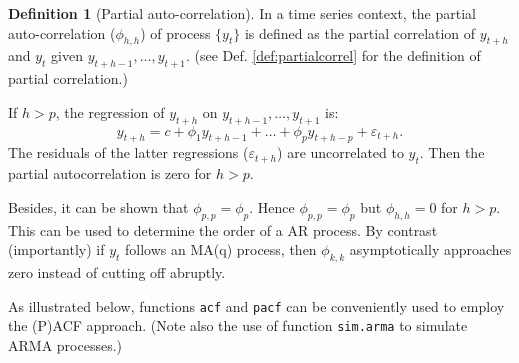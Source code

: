 \documentclass[
  12pt,
]{book}
\theoremstyle{definition}
\newtheorem{definition}{Definition}[chapter]
\theoremstyle{definition}
\theoremstyle{definition}
\theoremstyle{definition}
\theoremstyle{remark}
\begin{document}
\begin{definition}[Partial auto-correlation]
\protect\hypertarget{def:partialAC}{}\label{def:partialAC}In a time series context, the partial auto-correlation (\(\phi_{h,h}\)) of process \(\{y_t\}\) is defined as the partial correlation of \(y_{t+h}\) and \(y_t\) given \(y_{t+h-1},\dots,y_{t+1}\). (see Def. \ref{def:partialcorrel} for the definition of partial correlation.)
\end{definition}

If \(h>p\), the regression of \(y_{t+h}\) on \(y_{t+h-1},\dots,y_{t+1}\) is:
\[
y_{t+h} = c + \phi_1 y_{t+h-1}+\dots+ \phi_p  y_{t+h-p} + \varepsilon_{t+h}.
\]
The residuals of the latter regressions (\(\varepsilon_{t+h}\)) are uncorrelated to \(y_t\). Then the partial autocorrelation is zero for \(h>p\).

Besides, it can be shown that \(\phi_{p,p}=\phi_p\). Hence \(\phi_{p,p}=\phi_p\) but \(\phi_{h,h}=0\) for \(h>p\). This can be used to determine the order of a AR process. By contrast (importantly) if \(y_t\) follows an MA(q) process, then \(\phi_{k,k}\) asymptotically approaches zero instead of cutting off abruptly.

As illustrated below, functions \texttt{acf} and \texttt{pacf} can be conveniently used to employ the (P)ACF approach. (Note also the use of function \texttt{sim.arma} to simulate ARMA processes.)
\end{document}
